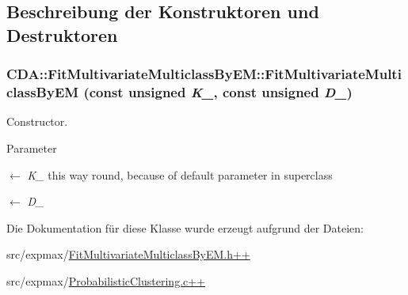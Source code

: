 \subsection{Beschreibung der Konstruktoren und Destruktoren}
\hypertarget{classCDA_1_1FitMultivariateMulticlassByEM_a8d6225a029e5e06f09e9820abe538286}{
\subsubsection[{FitMultivariateMulticlassByEM}]{\setlength{\rightskip}{0pt plus 5cm}CDA::FitMultivariateMulticlassByEM::FitMultivariateMulticlassByEM (const unsigned {\em K\_\-}, \/  const unsigned {\em D\_\-})}}
\label{classCDA_1_1FitMultivariateMulticlassByEM_a8d6225a029e5e06f09e9820abe538286}


Constructor. 


\begin{DoxyParams}{Parameter}
\item[\mbox{$\leftarrow$} {\em K\_\-}]this way round, because of default parameter in superclass \item[\mbox{$\leftarrow$} {\em D\_\-}]\end{DoxyParams}


Die Dokumentation für diese Klasse wurde erzeugt aufgrund der Dateien:\begin{DoxyCompactItemize}
\item 
src/expmax/\hyperlink{FitMultivariateMulticlassByEM_8h_09_09}{FitMultivariateMulticlassByEM.h++}\item 
src/expmax/\hyperlink{ProbabilisticClustering_8c_09_09}{ProbabilisticClustering.c++}\end{DoxyCompactItemize}
